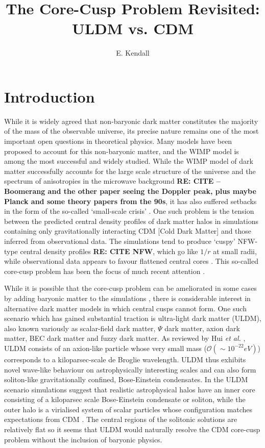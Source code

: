 \documentclass[a4paper,11pt]{article}
\title{\boldmath The Core-Cusp Problem Revisited: ULDM vs. CDM}
\author[1]{E. Kendall}
\affiliation[1]{Department of Physics, University of Auckland, Private Bag 92019, Auckland, New Zealand}
\newcommand{\re}[1]{{{\bf \color{green} RE: #1}}}
\begin{document}
\maketitle
\flushbottom

\section{Introduction}\label{sec:intro}

While it is widely agreed that non-baryonic dark matter constitutes the majority of the mass of the observable universe, its precise nature remains one of the most important open questions in theoretical physics. Many models have been proposed to account for this non-baryonic matter, and the WIMP model is among the most successful and widely studied. While the WIMP model of dark matter successfully accounts for the large scale structure of the universe \cite{Springel:2005nw} and the spectrum of anisotropies in the microwave background \re{CITE -- Boomerang and the other paper seeing the Doppler peak, plus maybe Planck and some theory papers from the 90s}, it has also suffered setbacks in the form of the so-called `small-scale crisis' \cite{Weinberg:2013aya}. One such problem is the tension between the predicted central density profiles of dark matter halos in simulations containing only gravitationally interacting CDM [Cold Dark Matter] and those inferred from observational data. The simulations tend to produce `cuspy' NFW-type central density profiles \re{CITE NFW}, which go like $1/r$ at small radii, while observational data appears to favour flattened central cores \cite{REF} . This so-called core-cusp problem has been the focus of much recent attention \cite{Dutton:2018nop, Read:2018pft, Genina:2018}. 

While it is possible that the core-cusp problem can be ameliorated in some cases by adding baryonic matter to the simulations  \cite{Benitez-Llambay:2018}, there is considerable interest in alternative dark matter models in which central cusps cannot form.  One such scenario which has gained substantial traction is ultra-light dark matter (ULDM), also known variously as scalar-field dark matter, $\Psi$ dark matter, axion dark matter, BEC dark matter and fuzzy dark matter. As reviewed by Hui {\em et al.\/} \cite{Hui:2016ltb}, ULDM consists of an axion-like particle whose very small mass  ($\mathcal{O}(\sim 10^{-22}eV)$) corresponds to a kiloparsec-scale de Broglie wavelength.  ULDM thus exhibits novel wave-like behaviour on astrophysically interesting scales and can also form soliton-like gravitationally confined, Bose-Einstein condensates. In the ULDM scenario simulations  \cite{Veltmaat:2018dfz} suggest that realistic astrophysical halos have an inner core consisting of a kiloparsec scale Bose-Einstein condensate or soliton, while the outer halo is a virialised system of scalar particles whose configuration matches expectations from CDM \cite{Schwabe:2016rze}. The central regions of the solitonic solutions are relatively flat so it seems that ULDM would naturally resolve the CDM core-cusp problem without the inclusion of baryonic physics. 
\end{document}
